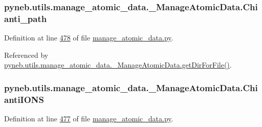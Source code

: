 \hypertarget{classpyneb_1_1utils_1_1manage__atomic__data_1_1___manage_atomic_data_a898e51085e3461333ea9df3a3fce3599}{}
\subsubsection[{Chianti\+\_\+path}]{\setlength{\rightskip}{0pt plus 5cm}pyneb.\+utils.\+manage\+\_\+atomic\+\_\+data.\+\_\+\+Manage\+Atomic\+Data.\+Chianti\+\_\+path}\label{classpyneb_1_1utils_1_1manage__atomic__data_1_1___manage_atomic_data_a898e51085e3461333ea9df3a3fce3599}


Definition at line \hyperlink{manage__atomic__data_8py_source_l00478}{478} of file \hyperlink{manage__atomic__data_8py_source}{manage\+\_\+atomic\+\_\+data.\+py}.



Referenced by \hyperlink{manage__atomic__data_8py_source_l00144}{pyneb.\+utils.\+manage\+\_\+atomic\+\_\+data.\+\_\+\+Manage\+Atomic\+Data.\+get\+Dir\+For\+File()}.

\hypertarget{classpyneb_1_1utils_1_1manage__atomic__data_1_1___manage_atomic_data_a06491f5f808df3d4e58b35e09db74a18}{}
\subsubsection[{Chianti\+I\+O\+N\+S}]{\setlength{\rightskip}{0pt plus 5cm}pyneb.\+utils.\+manage\+\_\+atomic\+\_\+data.\+\_\+\+Manage\+Atomic\+Data.\+Chianti\+I\+O\+N\+S}\label{classpyneb_1_1utils_1_1manage__atomic__data_1_1___manage_atomic_data_a06491f5f808df3d4e58b35e09db74a18}


Definition at line \hyperlink{manage__atomic__data_8py_source_l00477}{477} of file \hyperlink{manage__atomic__data_8py_source}{manage\+\_\+atomic\+\_\+data.\+py}.




